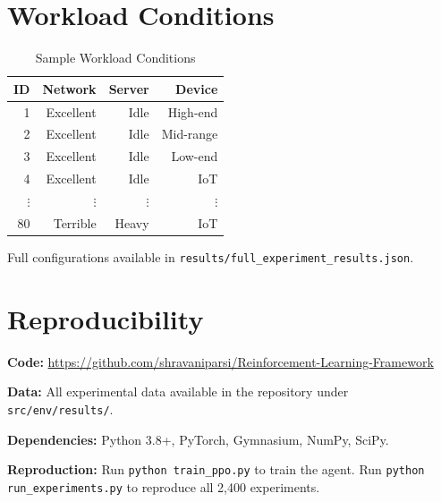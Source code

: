\documentclass[10pt,twocolumn]{article}
\begin{document}
\section{Workload Conditions}

\begin{table}[h]
\centering
\caption{Sample Workload Conditions}
\label{tab:workload}
\small
\begin{tabular}{rrrr}
\toprule
\textbf{ID} & \textbf{Network} & \textbf{Server} & \textbf{Device} \\
\midrule
1 & Excellent & Idle & High-end \\
2 & Excellent & Idle & Mid-range \\
3 & Excellent & Idle & Low-end \\
4 & Excellent & Idle & IoT \\
$\vdots$ & $\vdots$ & $\vdots$ & $\vdots$ \\
80 & Terrible & Heavy & IoT \\
\bottomrule
\end{tabular}
\end{table}

Full configurations available in \texttt{results/full\_experiment\_results.json}.

\section{Reproducibility}

\textbf{Code:} \url{https://github.com/shravaniparsi/Reinforcement-Learning-Framework}

\textbf{Data:} All experimental data available in the repository under \texttt{src/env/results/}.

\textbf{Dependencies:} Python 3.8+, PyTorch, Gymnasium, NumPy, SciPy.

\textbf{Reproduction:} Run \texttt{python train\_ppo.py} to train the agent. Run \texttt{python run\_experiments.py} to reproduce all 2,400 experiments.
\end{document}
